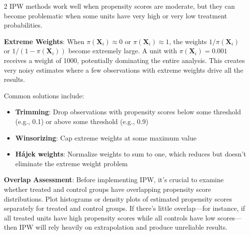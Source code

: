 \documentclass[12pt]{article}
\begin{document}
\begin{multicols}{2}
IPW methods work well when propensity scores are moderate, but they can become problematic when some units have very high or very low treatment probabilities.

\textbf{Extreme Weights}: When $\pi(\bm{X}_i) \approx 0$ or $\pi(\bm{X}_i) \approx 1$, the weights $1/\pi(\bm{X}_i)$ or $1/(1-\pi(\bm{X}_i))$ become extremely large.
A unit with $\pi(\bm{X}_i) = 0.001$ receives a weight of 1000, potentially dominating the entire analysis.
This creates very noisy estimates where a few observations with extreme weights drive all the results.

Common solutions include:
\begin{itemize}
  \item \textbf{Trimming}: Drop observations with propensity scores below some threshold (e.g., 0.1) or above some threshold (e.g., 0.9)
  \item \textbf{Winsorizing}: Cap extreme weights at some maximum value
  \item \textbf{Hájek weights}: Normalize weights to sum to one, which reduces but doesn't eliminate the extreme weight problem
\end{itemize}

\textbf{Overlap Assessment}: Before implementing IPW, it's crucial to examine whether treated and control groups have overlapping propensity score distributions.
Plot histograms or density plots of estimated propensity scores separately for treated and control groups.
If there's little overlap---for instance, if all treated units have high propensity scores while all controls have low scores---then IPW will rely heavily on extrapolation and produce unreliable results.


\end{multicols}
\end{document}
